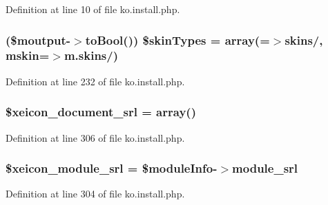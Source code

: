 Definition at line 10 of file ko.\+install.\+php.

\subsubsection[{\texorpdfstring{\$skin\+Types}{$skinTypes}}]{ (\$moutput-\/$>$to\+Bool()) \$skin\+Types = array(\textquotesingle{}=$>$\textquotesingle{}skins/\textquotesingle{}, \textquotesingle{}mskin\textquotesingle{}=$>$\textquotesingle{}m.\+skins/\textquotesingle{})}\hypertarget{ko_8install_8php_aa61073b7b359568eb3459da113fd8cdf}{}\label{ko_8install_8php_aa61073b7b359568eb3459da113fd8cdf}


Definition at line 232 of file ko.\+install.\+php.

\subsubsection[{\texorpdfstring{\$xeicon\+\_\+document\+\_\+srl}{$xeicon_document_srl}}]{\setlength{\rightskip}{0pt plus 5cm}\$xeicon\+\_\+document\+\_\+srl = array()}\hypertarget{ko_8install_8php_a41d95a71ebf0758e83224ab4bb3a31c0}{}\label{ko_8install_8php_a41d95a71ebf0758e83224ab4bb3a31c0}


Definition at line 306 of file ko.\+install.\+php.

\subsubsection[{\texorpdfstring{\$xeicon\+\_\+module\+\_\+srl}{$xeicon_module_srl}}]{\setlength{\rightskip}{0pt plus 5cm}\$xeicon\+\_\+module\+\_\+srl = \$module\+Info-\/$>${\bf module\+\_\+srl}}\hypertarget{ko_8install_8php_acf278a9931e1d1ea52b045c0fa42b9b3}{}\label{ko_8install_8php_acf278a9931e1d1ea52b045c0fa42b9b3}


Definition at line 304 of file ko.\+install.\+php.

